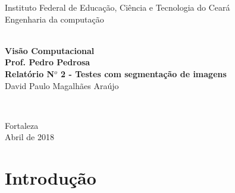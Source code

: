 \documentclass[12pt,fleqn]{article}
\begin{document}
\pagestyle {empty}


\vspace*{-2cm}
{\bf
\begin{center}
{\large
\hspace*{0cm}Instituto Federal de Educação, Ciência e Tecnologia do Ceará} \\
\vspace*{0.3cm}
\hspace*{0cm}Engenharia da computação\\
\hspace*{0cm}  \\
\end{center}}
\vspace{4.0cm}
\noindent
\begin{center}
{\Large \bf Visão Computacional \\ 
\vspace*{1.0cm}
Prof. Pedro Pedrosa \\
\vspace*{1.0cm}
Relatório N$^o$ 2 - Testes com segmentação de imagens} \\[3cm]
{\Large David Paulo Magalhães Araújo}\\[6mm]

\end{center}




{\raggedleft
\begin{minipage}[t]{6.3cm}
\setlength{\baselineskip}{0.25in}

\end{minipage}\\[6cm]}
\vspace{1cm}
{\center Fortaleza \\[3mm]
Abril de 2018 \\}


\newpage

\newpage

\tableofcontents
\pagestyle {plain}

\setcounter{page}{0} 

  
\setlength{\parindent}{0in}  %
\parskip 5pt  
\newpage
\section{Introdução}
\end{document}
